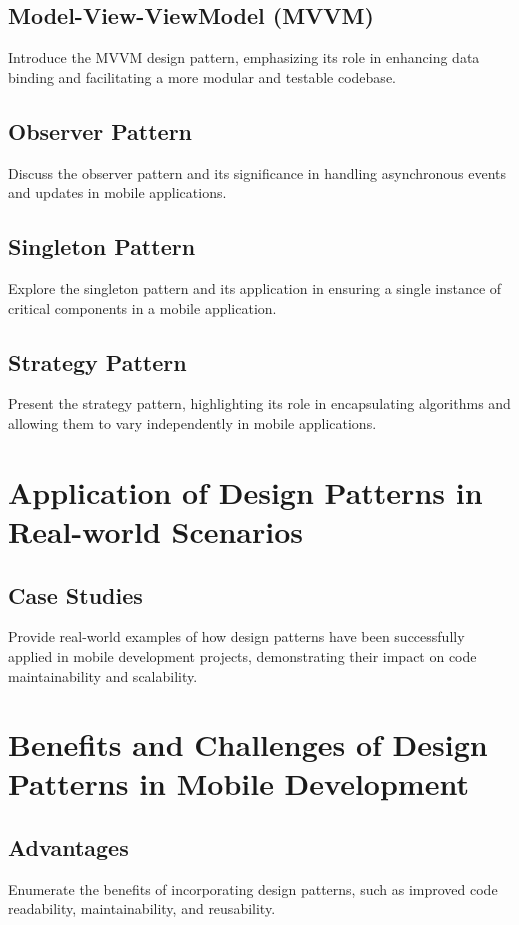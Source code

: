 \documentclass{article}
\begin{document}
	\subsection{Model-View-ViewModel (MVVM)}
	Introduce the MVVM design pattern, emphasizing its role in enhancing data binding and facilitating a more modular and testable codebase.
	
	\subsection{Observer Pattern}
	Discuss the observer pattern and its significance in handling asynchronous events and updates in mobile applications.
	
	\subsection{Singleton Pattern}
	Explore the singleton pattern and its application in ensuring a single instance of critical components in a mobile application.
	
	\subsection{Strategy Pattern}
	Present the strategy pattern, highlighting its role in encapsulating algorithms and allowing them to vary independently in mobile applications.
	
	\section{Application of Design Patterns in Real-world Scenarios}
	\subsection{Case Studies}
	Provide real-world examples of how design patterns have been successfully applied in mobile development projects, demonstrating their impact on code maintainability and scalability.
	
	\section{Benefits and Challenges of Design Patterns in Mobile Development}
	\subsection{Advantages}
	Enumerate the benefits of incorporating design patterns, such as improved code readability, maintainability, and reusability.
	
\end{document}
